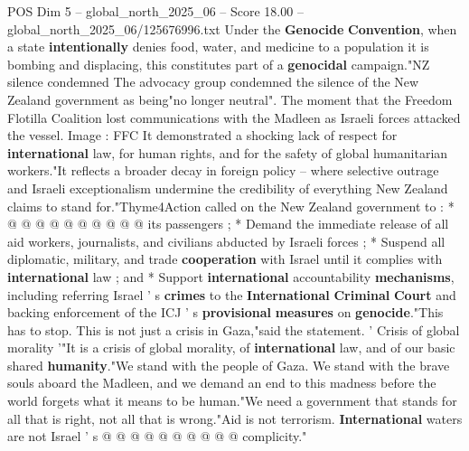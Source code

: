 \begin{textsample}{POS Dim 5 – global\_north\_2025\_06 – Score 18.00 – global\_north\_2025\_06/125676996.txt}
Under the \textbf{Genocide} \textbf{Convention}, when a state \textbf{intentionally} denies food, water, and medicine to a population it is bombing and displacing, this constitutes part of a \textbf{genocidal} campaign."NZ silence condemned The advocacy group condemned the silence of the New Zealand government as being"no longer neutral".
The moment that the Freedom Flotilla Coalition lost communications with the Madleen as Israeli forces attacked the vessel.
Image : FFC It demonstrated a shocking lack of respect for \textbf{international} law, for human rights, and for the safety of global humanitarian workers."It reflects a broader decay in foreign policy -- where selective outrage and Israeli exceptionalism undermine the credibility of everything New Zealand claims to stand for."Thyme4Action called on the New Zealand government to : * @ @ @ @ @ @ @ @ @ @ its passengers ; * Demand the immediate release of all aid workers, journalists, and civilians abducted by Israeli forces ; * Suspend all diplomatic, military, and trade \textbf{cooperation} with Israel until it complies with \textbf{international} law ; and * Support \textbf{international} accountability \textbf{mechanisms}, including referring Israel ' s \textbf{crimes} to the \textbf{International} \textbf{Criminal} \textbf{Court} and backing enforcement of the ICJ ' s \textbf{provisional} \textbf{measures} on \textbf{genocide}."This has to stop.
This is not just a crisis in Gaza,"said the statement. ' Crisis of global morality '"It is a crisis of global morality, of \textbf{international} law, and of our basic shared \textbf{humanity}."We stand with the people of Gaza.
We stand with the brave souls aboard the Madleen, and we demand an end to this madness before the world forgets what it means to be human."We need a government that stands for all that is right, not all that is wrong."Aid is not terrorism. \textbf{International} waters are not Israel ' s @ @ @ @ @ @ @ @ @ @ complicity."

\end{textsample}
